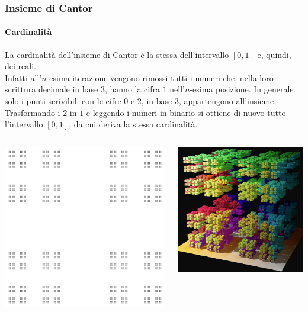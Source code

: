 \documentclass{beamer}
\begin{document}
			\begin{frame}
				\frametitle{Insieme di Cantor}
				\framesubtitle{Cardinalità}
				La cardinalità dell'insieme di Cantor è la stessa dell'intervallo $[0, 1]$ e, quindi, dei reali.\\
				Infatti all'$n$-esima iterazione  vengono rimossi tutti i numeri che, nella loro scrittura decimale in base $3$, hanno la cifra $1$ nell'$n$-esima posizione. In generale solo i punti scrivibili con le cifre $0$ e $2$, in base $3$,  appartengono all'insieme. Trasformando i $2$ in $1$ e leggendo i numeri in binario si ottiene di nuovo tutto l'intervallo $[0, 1]$, da cui deriva la stessa cardinalità.
				\begin{columns}
					\begin{column}{0.5\textwidth}
						\begin{center}
							\includegraphics[width=0.5\linewidth]{"../Insieme di Cantor/Cantor_dust"}
						\end{center}
					\end{column}
					\begin{column}{0.5\textwidth}
						\begin{center}
							\includegraphics[width=0.5\linewidth]{"../Insieme di Cantor/3D_Cantor_set"}
						\end{center}
					\end{column}
				\end{columns}
			\end{frame}
\end{document}
